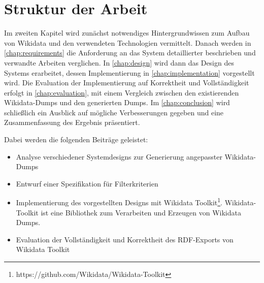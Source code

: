 \section{Struktur der Arbeit}
Im zweiten Kapitel wird zunächst notwendiges Hintergrundwissen zum Aufbau von Wikidata und den verwendeten Technologien vermittelt.
Danach werden in \cref{chap:requirements} die Anforderung an das System detaillierter beschrieben und verwandte Arbeiten verglichen.
In \cref{chap:design} wird dann das Design des Systems erarbeitet, dessen Implementierung in \cref{chap:implementation} vorgestellt wird.
Die Evaluation der Implementierung auf Korrektheit und Vollständigkeit erfolgt in \cref{chap:evaluation}, mit einem  Vergleich zwischen den existierenden Wikidata-Dumps und den generierten Dumps.
Im \cref{chap:conclusion} wird schließlich ein Ausblick auf mögliche Verbesserungen gegeben und eine Zusammenfassung des Ergebnis präsentiert.

Dabei werden die folgenden Beiträge geleistet:
\begin{itemize}
  \item Analyse verschiedener Systemdesigns zur Generierung angepasster Wikidata-Dumps
  \item Entwurf einer Spezifikation für Filterkriterien
  \item Implementierung des vorgestellten Designs mit Wikidata Toolkit\footnote{https://github.com/Wikidata/Wikidata-Toolkit}. Wikidata-Toolkit ist eine Bibliothek zum Verarbeiten und Erzeugen von Wikidata Dumps.
  \item Evaluation der Vollständigkeit und Korrektheit des RDF-Exports von Wikidata Toolkit
\end{itemize}